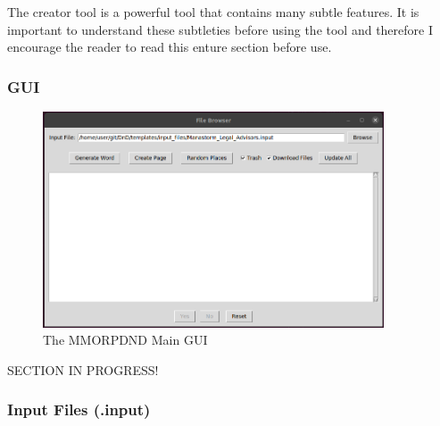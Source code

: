 The creator tool is a powerful tool that contains many subtle features. It is important to understand these subtleties before using the tool and therefore I encourage the reader to read this enture section before use. 

\subsubsection{GUI}

\begin{figure}[h]
	\centering
	\includegraphics[width=0.9\textwidth]{images/creator_gui.png}
	\caption{The MMORPDND Main GUI}
	\label{fig:creator_gui}
\end{figure}

SECTION IN PROGRESS!

\subsubsection{Input Files (.input)}

